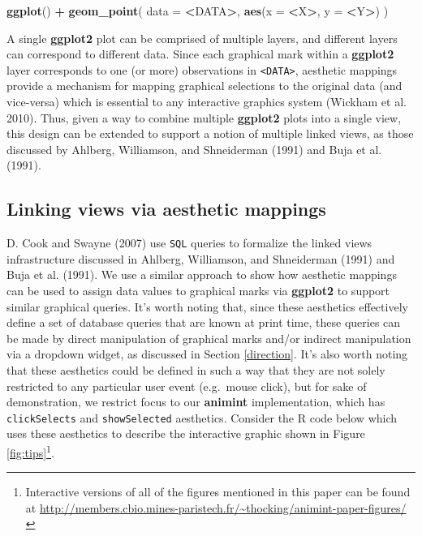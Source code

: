 \documentclass[12pt,]{article}
\newenvironment{Shaded}{\begin{snugshade}}{\end{snugshade}}
\newcommand{\DataTypeTok}[1]{\textcolor[rgb]{0.13,0.29,0.53}{#1}}
\newcommand{\KeywordTok}[1]{\textcolor[rgb]{0.13,0.29,0.53}{\textbf{#1}}}
\newcommand{\NormalTok}[1]{#1}
\newcommand{\OperatorTok}[1]{\textcolor[rgb]{0.81,0.36,0.00}{\textbf{#1}}}
\newcommand{\StringTok}[1]{\textcolor[rgb]{0.31,0.60,0.02}{#1}}
\let\rmarkdownfootnote\footnote%
\def\footnote{\protect\rmarkdownfootnote}
\theoremstyle{definition}
\theoremstyle{definition}
\theoremstyle{definition}
\theoremstyle{remark}
\begin{document}
\begin{Shaded}
\begin{Highlighting}[]
\KeywordTok{ggplot}\NormalTok{() }\OperatorTok{+}\StringTok{ }\KeywordTok{geom_point}\NormalTok{(}
  \DataTypeTok{data =} \OperatorTok{<}\NormalTok{DATA}\OperatorTok{>}\NormalTok{, }
  \KeywordTok{aes}\NormalTok{(}\DataTypeTok{x =} \OperatorTok{<}\NormalTok{X}\OperatorTok{>}\NormalTok{, }\DataTypeTok{y =} \OperatorTok{<}\NormalTok{Y}\OperatorTok{>}\NormalTok{)}
\NormalTok{)}
\end{Highlighting}
\end{Shaded}

A single \textbf{ggplot2} plot can be comprised of multiple layers, and
different layers can correspond to different data. Since each graphical
mark within a \textbf{ggplot2} layer corresponds to one (or more)
observations in \texttt{\textless{}DATA\textgreater{}}, aesthetic
mappings provide a mechanism for mapping graphical selections to the
original data (and vice-versa) which is essential to any interactive
graphics system (Wickham et al. 2010). Thus, given a way to combine
multiple \textbf{ggplot2} plots into a single view, this design can be
extended to support a notion of multiple linked views, as those
discussed by Ahlberg, Williamson, and Shneiderman (1991) and Buja et al.
(1991).

\hypertarget{extension}{%
\subsection{Linking views via aesthetic mappings}\label{extension}}

D. Cook and Swayne (2007) use \texttt{SQL} queries to formalize the
linked views infrastructure discussed in Ahlberg, Williamson, and
Shneiderman (1991) and Buja et al. (1991). We use a similar approach to
show how aesthetic mappings can be used to assign data values to
graphical marks via \textbf{ggplot2} to support similar graphical
queries. It's worth noting that, since these aesthetics effectively
define a set of database queries that are known at print time, these
queries can be made by direct manipulation of graphical marks and/or
indirect manipulation via a dropdown widget, as discussed in Section
\ref{direction}. It's also worth noting that these aesthetics could be
defined in such a way that they are not solely restricted to any
particular user event (e.g.~mouse click), but for sake of demonstration,
we restrict focus to our \textbf{animint} implementation, which has
\texttt{clickSelects} and \texttt{showSelected} aesthetics. Consider the
R code below which uses these aesthetics to describe the interactive
graphic shown in Figure \ref{fig:tips}\footnote{Interactive versions
of all of the figures mentioned in this paper can be found at
\url{http://members.cbio.mines-paristech.fr/~thocking/animint-paper-figures/}}.
\end{document}
